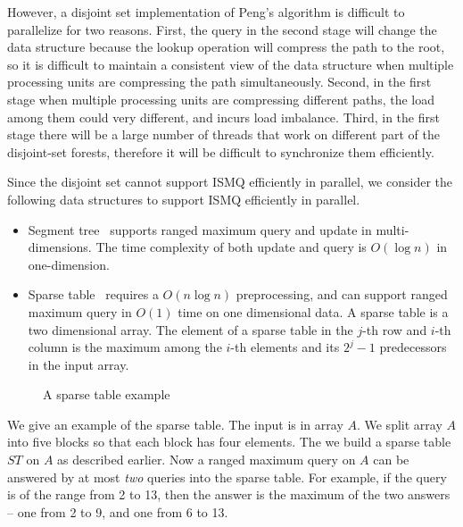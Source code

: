 However, a disjoint set implementation of Peng's algorithm is difficult
to parallelize for two reasons.  First, the query in the second stage
will change the data structure because the lookup operation will
compress the path to the root, so it is difficult to maintain a
consistent view of the data structure when multiple processing units are
compressing the path simultaneously.  Second, in the first stage when
multiple processing units are compressing different paths, the load
among them could very different, and incurs load imbalance.  Third, in
the first stage there will be a large number of threads that work on
different part of the disjoint-set forests, therefore it will be
difficult to synchronize them efficiently.

Since the disjoint set cannot support ISMQ efficiently in parallel, we
consider the following data structures to support ISMQ efficiently in
parallel.

\begin{itemize}
  \item Segment tree~\cite{berg2000computational} supports ranged
    maximum query and update in multi-dimensions.  The time complexity
    of both update and query is $O(\log n)$ in one-dimension.
  \item Sparse table~\cite{Berkman1993RecursiveSP} requires a $O(n
    \log n)$ preprocessing, and can support ranged maximum query in
    $O(1)$ time on one dimensional data.  A sparse table is a two
    dimensional array.  The element of a sparse table in the $j$-th
    row and $i$-th column is the maximum among the $i$-th elements
    and its $2^j - 1$ predecessors in the input array.
\end{itemize}

\begin{figure}[!thb]
  \centering {} 
  \caption{A sparse table example}
  \label{fig:interval-decomposition}
\end{figure}

We give an example of the sparse table.  The input is in array $A$. We
split array $A$ into five blocks so that each block has four elements.
The we build a sparse table $ST$ on $A$ as described earlier.  Now a
ranged maximum query on $A$ can be answered by at most {\em two}
queries into the sparse table.  For example, if the query is of the
range from 2 to 13, then the answer is the maximum of the two answers
-- one from 2 to 9, and one from 6 to 13.

